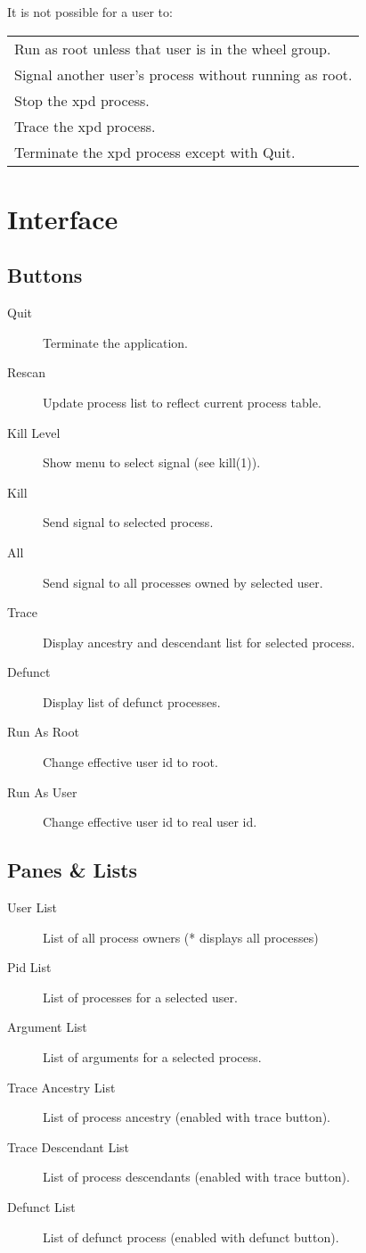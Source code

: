 It is not possible for a user to:

\begin{tabular}{l}
Run as root unless that user is in the wheel group.\\
Signal another user's process without running as root.\\
Stop the xpd process.\\
Trace the xpd process.\\
Terminate the xpd process except with Quit.\\
\end{tabular}

\appendix
\newpage
{}

\chapter{Interface}
\section{Buttons}
\begin{description}
\item[Quit] Terminate the application.
\item[Rescan] Update process list to reflect current process table.
\item[Kill Level] Show menu to select signal (see kill(1)).
\item[Kill] Send signal to selected process.
\item[All] Send signal to all processes owned by selected user.
\item[Trace] Display ancestry and descendant list for selected process.
\item[Defunct] Display list of defunct processes.
\item[Run As Root] Change effective user id to root.
\item[Run As User] Change effective user id to real user id.
\end{description}

\section{Panes \& Lists}
\begin{description}
\item[User List] List of all process owners (* displays all processes)
\item[Pid List] List of processes for a selected user.
\item[Argument List] List of arguments for a selected process.
\item[Trace Ancestry List] List of process ancestry (enabled with trace button).
\item[Trace Descendant List] List of process descendants (enabled with trace button).
\item[Defunct List] List of defunct process (enabled with defunct button).
\end{description}

